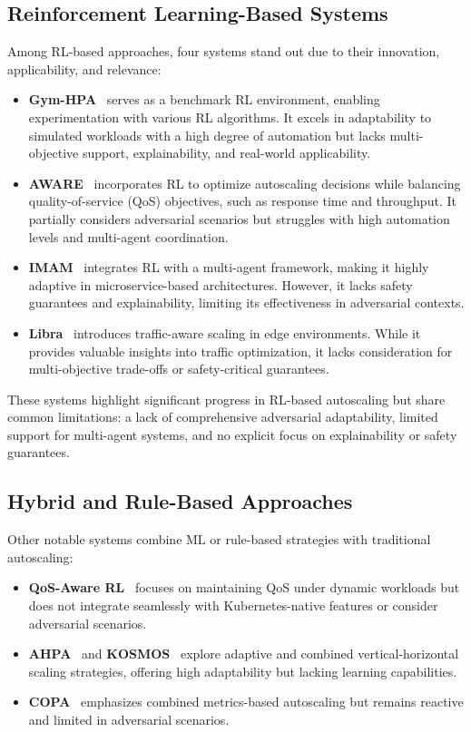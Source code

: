 \documentclass[conference]{IEEEtran}
\begin{document}
\subsection*{Reinforcement Learning-Based Systems}
Among RL-based approaches, four systems stand out due to their innovation, applicability, and relevance:

\begin{itemize}
    \item \textbf{Gym-HPA}~\cite{GymHPA} serves as a benchmark RL environment, enabling experimentation with various RL algorithms. It excels in adaptability to simulated workloads with a high degree of automation but lacks multi-objective support, explainability, and real-world applicability.
    \item \textbf{AWARE}~\cite{AWARE} incorporates RL to optimize autoscaling decisions while balancing quality-of-service (QoS) objectives, such as response time and throughput. It partially considers adversarial scenarios but struggles with high automation levels and multi-agent coordination.
    \item \textbf{IMAM}~\cite{IMAM} integrates RL with a multi-agent framework, making it highly adaptive in microservice-based architectures. However, it lacks safety guarantees and explainability, limiting its effectiveness in adversarial contexts.
    \item \textbf{Libra}~\cite{Libra} introduces traffic-aware scaling in edge environments. While it provides valuable insights into traffic optimization, it lacks consideration for multi-objective trade-offs or safety-critical guarantees.
\end{itemize}

These systems highlight significant progress in RL-based autoscaling but share common limitations: a lack of comprehensive adversarial adaptability, limited support for multi-agent systems, and no explicit focus on explainability or safety guarantees.

\subsection*{Hybrid and Rule-Based Approaches}
Other notable systems combine ML or rule-based strategies with traditional autoscaling:

\begin{itemize}
    \item \textbf{QoS-Aware RL}~\cite{QoSRL} focuses on maintaining QoS under dynamic workloads but does not integrate seamlessly with Kubernetes-native features or consider adversarial scenarios.
    \item \textbf{AHPA}~\cite{AHPA} and \textbf{KOSMOS}~\cite{KOSMOS} explore adaptive and combined vertical-horizontal scaling strategies, offering high adaptability but lacking learning capabilities.
    \item \textbf{COPA}~\cite{COPA} emphasizes combined metrics-based autoscaling but remains reactive and limited in adversarial scenarios.
\end{itemize}
\end{document}
